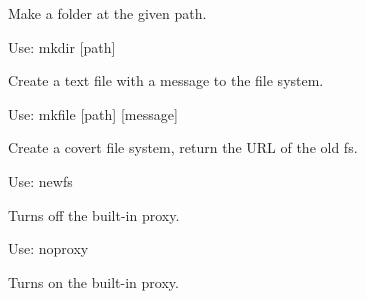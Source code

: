 \documentclass[letterpaper,10pt,english]{sphinxmanual}
\begin{document}
\begin{fulllineitems}

\begin{fulllineitems}
\label{main:main.Console.do_mkdir}
Make a folder at the given path.

Use: mkdir {[}path{]}

\end{fulllineitems}


\begin{fulllineitems}
\label{main:main.Console.do_mkfile}
Create a text file with a message to the file system.

Use: mkfile {[}path{]} {[}message{]}

\end{fulllineitems}


\begin{fulllineitems}
\label{main:main.Console.do_mount}
\end{fulllineitems}


\begin{fulllineitems}
\label{main:main.Console.do_newfs}
Create a covert file system, return the URL of the old fs.

Use: newfs

\end{fulllineitems}


\begin{fulllineitems}
\label{main:main.Console.do_noproxy}
Turns off the built-in proxy.

Use: noproxy

\end{fulllineitems}


\begin{fulllineitems}
\label{main:main.Console.do_proxy}
Turns on the built-in proxy.


\end{fulllineitems}
\end{fulllineitems}
\end{document}

